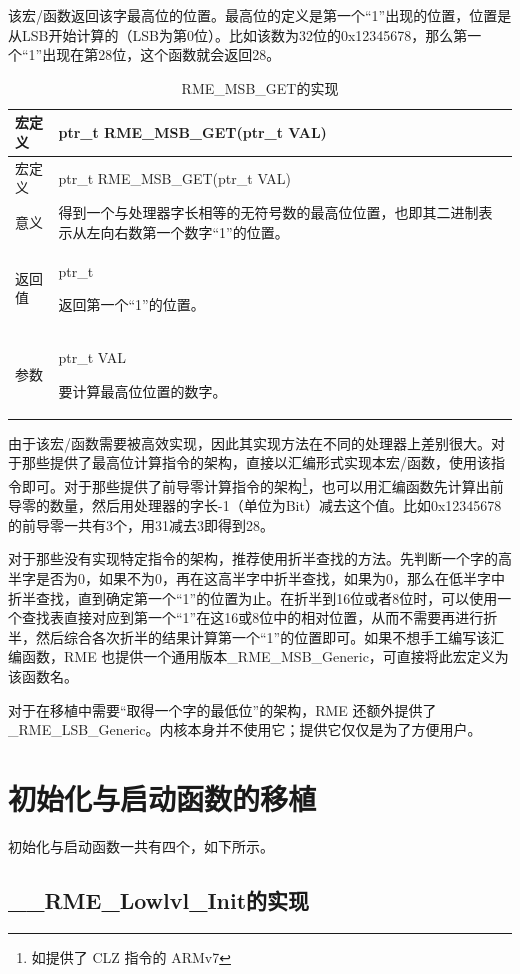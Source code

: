 该宏/函数返回该字最高位的位置。最高位的定义是第一个``1''出现的位置，位置是从LSB开始计算的（LSB为第0位）。比如该数为32位的0x12345678，那么第一个``1''出现在第28位，这个函数就会返回28。

\begin{xltabular}{\textwidth}{@{}>{\hsize\raggedright\arraybackslash}X>{\hsize\raggedright\arraybackslash}X@{}}
\caption{RME\_MSB\_GET的实现}\label{tab:7-34-rme-msb-get-implementation}\\
\toprule
宏定义 & ptr\_t RME\_MSB\_GET(ptr\_t VAL)\tabularnewline
\endfirsthead
\toprule
宏定义 & ptr\_t RME\_MSB\_GET(ptr\_t VAL)\tabularnewline
\midrule
\endhead
\bottomrule
\endlastfoot
意义 &
得到一个与处理器字长相等的无符号数的最高位位置，也即其二进制表示从左向右数第一个数字``1''的位置。\tabularnewline
返回值\strut
 & ptr\_t

返回第一个``1''的位置。\strut
\tabularnewline
参数\strut
 & ptr\_t VAL

要计算最高位位置的数字。\strut
\tabularnewline
\end{xltabular}

由于该宏/函数需要被高效实现，因此其实现方法在不同的处理器上差别很大。对于那些提供了最高位计算指令的架构，直接以汇编形式实现本宏/函数，使用该指令即可。对于那些提供了前导零计算指令的架构\footnote{如提供了 CLZ 指令的 ARMv7}，也可以用汇编函数先计算出前导零的数量，然后用处理器的字长-1（单位为Bit）减去这个值。比如0x12345678的前导零一共有3个，用31减去3即得到28。

对于那些没有实现特定指令的架构，推荐使用折半查找的方法。先判断一个字的高半字是否为0，如果不为0，再在这高半字中折半查找，如果为0，那么在低半字中折半查找，直到确定第一个``1''的位置为止。在折半到16位或者8位时，可以使用一个查找表直接对应到第一个``1''在这16或8位中的相对位置，从而不需要再进行折半，然后综合各次折半的结果计算第一个``1''的位置即可。如果不想手工编写该汇编函数，RME 也提供一个通用版本\_RME\_MSB\_Generic，可直接将此宏定义为该函数名。

对于在移植中需要``取得一个字的最低位''的架构，RME 还额外提供了\_RME\_LSB\_Generic。内核本身并不使用它；提供它仅仅是为了方便用户。

\section{初始化与启动函数的移植}\label{sec:7-init-and-boot-function-porting}

初始化与启动函数一共有四个，如下所示。

\subsection{\_\_RME\_Lowlvl\_Init的实现}\label{subsec:7-rme-lowlvl-init-implementation}

